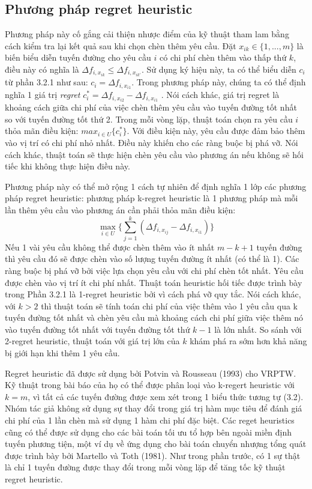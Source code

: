 \subsection{Phương pháp regret heuristic}
Phương pháp này cố gắng cải thiện nhược điểm của kỹ thuật tham lam bằng cách kiểm tra lại kết quả sau khi chọn chèn thêm yêu cầu. Đặt $x_{ik} \in \{1, ..., m\}$ là biến biểu diễn tuyến đường cho yêu cầu $i$ có chi phí chèn thêm vào thấp thứ $k$, điều này có nghĩa là $\Delta f_{i, x_{ik}} \leqslant \Delta f_{i, x_{ik'}}$. Sử dụng ký hiệu này, ta có thể biểu diễn $c_i$ từ phần 3.2.1 như sau: $c_i = \Delta f_{i, x_{i1}}$. Trong phương pháp này, chúng ta có thể định nghĩa 1 giá trị \textit{regret} $c_i^* = \Delta f_{i, x_{i2}} - \Delta f_{i, x_{i1}}$ . Nói cách khác, giá trị regret là khoảng cách giữa chi phí của việc chèn thêm yêu cầu vào tuyến đường tốt nhất so với tuyến đường tốt thứ 2. Trong mỗi vòng lặp, thuật toán chọn ra yêu cầu $i$ thỏa mãn điều kiện: $max_{i \in U} \{c_i^*\}$. Với điều kiện này, yêu cầu được đảm bảo thêm vào vị trí có chi phí nhỏ nhất. Điều này khiến cho các ràng buộc bị phá vỡ. Nói cách khác, thuật toán sẽ thực hiện chèn yêu cầu vào phương án nếu không sẽ hối tiếc khi không thực hiện điều này.

Phương pháp này có thể mở rộng 1 cách tự nhiên để định nghĩa 1 lớp các phương pháp regret heuristic: phương pháp k-regret heuristic là 1 phương pháp mà mỗi lần thêm yêu cầu vào phương án cần phải thỏa mãn điều kiện:
\begin{equation}
    \max\limits_{i \in U} \{ \sum_{j=1}^k (\Delta f_{i, x_{ij}} - \Delta f_{i, x_{i1}}) \}
\end{equation}
Nếu 1 vài yêu cầu không thể được chèn thêm vào ít nhất $m-k+1$ tuyến đường thì yêu cầu đó sẽ được chèn vào số lượng tuyến đường ít nhất (có thể là 1). Các ràng buộc bị phá vỡ bởi việc lựa chọn yêu cầu với chi phí chèn tốt nhất. Yêu cầu được chèn vào vị trí ít chi phí nhất. Thuật toán heuristic hối tiếc được trình bày trong Phần 3.2.1 là 1-regret heuristic bởi vì cách phá vỡ quy tắc. Nói cách khác, với $k>2$ thì thuật toán sẽ tính toán chi phí của việc thêm vào 1 yêu cầu qua k tuyến đường tốt nhất và chèn yêu cầu mà khoảng cách chi phí giữa việc thêm nó vào tuyến đường tốt nhất với tuyến đường tốt thứ $k-1$ là lớn nhất. So sánh với 2-regret heuristic, thuật toán với giá trị lớn của $k$ khám phá ra sớm hơn khả năng bị giới hạn khi thêm 1 yêu cầu.

Regret heuristic đã được sử dụng bởi Potvin và Rousseau (1993) cho VRPTW. Kỹ thuật trong bài báo của họ có thể được phân loại vào k-regert heuristic với $k=m$, vì tất cả các tuyến đường được xem xét trong 1 biểu thức tương tự (3.2). Nhóm tác giả không sử dụng sự thay đổi trong giá trị hàm mục tiêu để đánh giá chi phí của 1 lần chèn mà sử dụng 1 hàm chi phí đặc biệt. Các reget heuristics cũng có thể được sử dụng cho các bài toán tối ưu tổ hợp bên ngoài miền định tuyến phương tiện, một ví dụ về ứng dụng cho bài toán chuyển nhượng tổng quát được trình bày bởi Martello và Toth (1981). Như trong phần trước, có 1 sự thật là chỉ 1 tuyến đường được thay đổi trong mỗi vòng lặp để tăng tốc kỹ thuật regret heuristic.